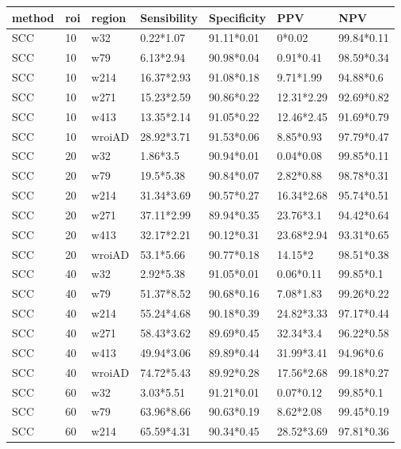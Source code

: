 \begin{table}[ht]
\centering
\begin{tabular}{lllllll}
  \hline
method & roi & region & Sensibility & Specificity & PPV & NPV \\ 
  \hline
SCC & 10 & w32 & 0.22*1.07 & 91.11*0.01 & 0*0.02 & 99.84*0.11 \\ 
  SCC & 10 & w79 & 6.13*2.94 & 90.98*0.04 & 0.91*0.41 & 98.59*0.34 \\ 
  SCC & 10 & w214 & 16.37*2.93 & 91.08*0.18 & 9.71*1.99 & 94.88*0.6 \\ 
  SCC & 10 & w271 & 15.23*2.59 & 90.86*0.22 & 12.31*2.29 & 92.69*0.82 \\ 
  SCC & 10 & w413 & 13.35*2.14 & 91.05*0.22 & 12.46*2.45 & 91.69*0.79 \\ 
  SCC & 10 & wroiAD & 28.92*3.71 & 91.53*0.06 & 8.85*0.93 & 97.79*0.47 \\ 
  SCC & 20 & w32 & 1.86*3.5 & 90.94*0.01 & 0.04*0.08 & 99.85*0.11 \\ 
  SCC & 20 & w79 & 19.5*5.38 & 90.84*0.07 & 2.82*0.88 & 98.78*0.31 \\ 
  SCC & 20 & w214 & 31.34*3.69 & 90.57*0.27 & 16.34*2.68 & 95.74*0.51 \\ 
  SCC & 20 & w271 & 37.11*2.99 & 89.94*0.35 & 23.76*3.1 & 94.42*0.64 \\ 
  SCC & 20 & w413 & 32.17*2.21 & 90.12*0.31 & 23.68*2.94 & 93.31*0.65 \\ 
  SCC & 20 & wroiAD & 53.1*5.66 & 90.77*0.18 & 14.15*2 & 98.51*0.38 \\ 
  SCC & 40 & w32 & 2.92*5.38 & 91.05*0.01 & 0.06*0.11 & 99.85*0.1 \\ 
  SCC & 40 & w79 & 51.37*8.52 & 90.68*0.16 & 7.08*1.83 & 99.26*0.22 \\ 
  SCC & 40 & w214 & 55.24*4.68 & 90.18*0.39 & 24.82*3.33 & 97.17*0.44 \\ 
  SCC & 40 & w271 & 58.43*3.62 & 89.69*0.45 & 32.34*3.4 & 96.22*0.58 \\ 
  SCC & 40 & w413 & 49.94*3.06 & 89.89*0.44 & 31.99*3.41 & 94.96*0.6 \\ 
  SCC & 40 & wroiAD & 74.72*5.43 & 89.92*0.28 & 17.56*2.68 & 99.18*0.27 \\ 
  SCC & 60 & w32 & 3.03*5.51 & 91.21*0.01 & 0.07*0.12 & 99.85*0.1 \\ 
  SCC & 60 & w79 & 63.96*8.66 & 90.63*0.19 & 8.62*2.08 & 99.45*0.19 \\ 
  SCC & 60 & w214 & 65.59*4.31 & 90.34*0.45 & 28.52*3.69 & 97.81*0.36 \\ 

\end{tabular}
\end{table}
